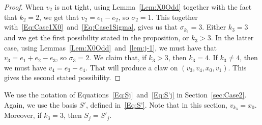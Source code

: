 \begin{proof}
When $v_2$ is not tight, using Lemma~\ref{Lem:X0Odd} together with the fact that $k_2 = 2$, we get that $v_2 = e_1 - e_2$, so $\sigma_2 = 1$. This together with~\eqref{Eq:Case1X0}~and~\eqref{Eq:Case1Sigma}, gives us that $\sigma_{k_3} = 3$. Either $k_3=3$ and we get the first possibility stated in the proposition, or $k_3>3$. In the latter case, using Lemmas~\ref{Lem:X0Odd}~and~\ref{lem:j-1}, we must have that $v_3=e_1+e_2-e_3$, so $\sigma_3=2$. We claim that, if $k_3>3$, then $k_3=4$. If $k_3\not = 4$, then we must have $v_4=e_3-e_4$. That will produce a claw on $(v_3, v_4, x_0, v_1)$. This gives the second stated possibility.  
\end{proof}


We use the notation of Equations~\eqref{Eq:Sj}~and~\eqref{Eq:S'j} in Section~\ref{sec:Case2}. Again, we use the basis $S'$, defined in~\eqref{Eq:S'}. Note that in this section, $v_{k_3} = x_0$. Moreover, if $k_3=3$, then $S_j=S'_j$.





